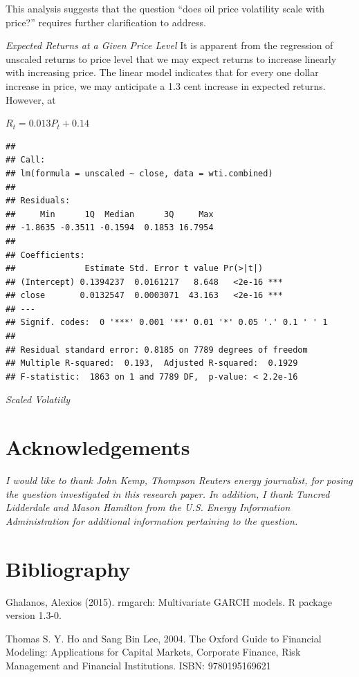 \documentclass[]{article}
\begin{document}
This analysis suggests that the question ``does oil price volatility
scale with price?'' requires further clarification to address.

\emph{Expected Returns at a Given Price Level} It is apparent from the
regression of unscaled returns to price level that we may expect returns
to increase linearly with increasing price. The linear model indicates
that for every one dollar increase in price, we may anticipate a 1.3
cent increase in expected returns. However, at

\(R_t = 0.013P_t+0.14\)

\begin{verbatim}
## 
## Call:
## lm(formula = unscaled ~ close, data = wti.combined)
## 
## Residuals:
##     Min      1Q  Median      3Q     Max 
## -1.8635 -0.3511 -0.1594  0.1853 16.7954 
## 
## Coefficients:
##              Estimate Std. Error t value Pr(>|t|)    
## (Intercept) 0.1394237  0.0161217   8.648   <2e-16 ***
## close       0.0132547  0.0003071  43.163   <2e-16 ***
## ---
## Signif. codes:  0 '***' 0.001 '**' 0.01 '*' 0.05 '.' 0.1 ' ' 1
## 
## Residual standard error: 0.8185 on 7789 degrees of freedom
## Multiple R-squared:  0.193,  Adjusted R-squared:  0.1929 
## F-statistic:  1863 on 1 and 7789 DF,  p-value: < 2.2e-16
\end{verbatim}

\emph{Scaled Volatiily}

\section{Acknowledgements}\label{acknowledgements}

\emph{I would like to thank John Kemp, Thompson Reuters energy
journalist, for posing the question investigated in this research paper.
In addition, I thank Tancred Lidderdale and Mason Hamilton from the U.S.
Energy Information Administration for additional information pertaining
to the question.}

\section{Bibliography}\label{bibliography}

Ghalanos, Alexios (2015). rmgarch: Multivariate GARCH models. R package
version 1.3-0.

Thomas S. Y. Ho and Sang Bin Lee, 2004. The Oxford Guide to Financial
Modeling: Applications for Capital Markets, Corporate Finance, Risk
Management and Financial Institutions. ISBN: 9780195169621
\end{document}

